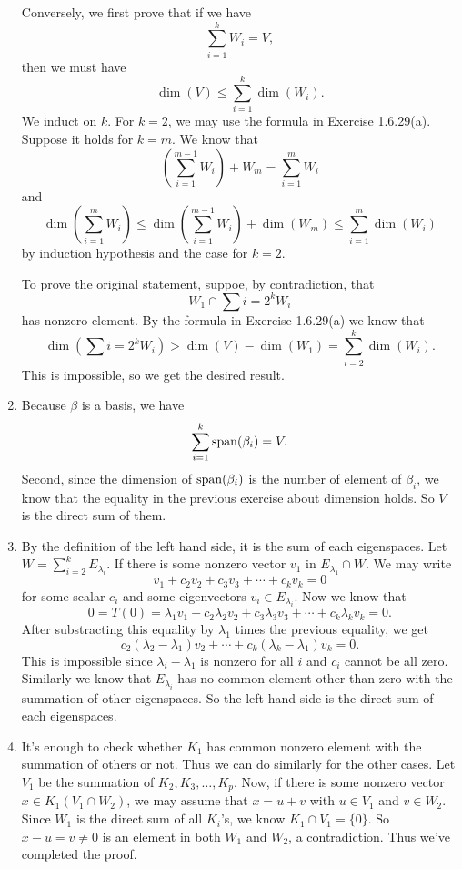 \begin{enumerate}
Conversely, we first prove that if we have 
\[\sum_{i=1}^k{W_i}=V,\]
then we must have 
\[\dim(V)\leq \sum_{i=1}^k{\dim(W_i)}.\]
We induct on $k$. For $k=2$, we may use the formula in Exercise 1.6.29(a). Suppose it holds for $k=m$. We know that 
\[(\sum_{i=1}^{m-1}{W_i})+W_m=\sum_{i=1}^m{W_i}\]
and 
\[\dim(\sum_{i=1}^m{W_i})\leq \dim(\sum_{i=1}^{m-1}{W_i})+\dim(W_m)\leq \sum_{i=1}^m{\dim(W_i)}\]
by induction hypothesis and the case for $k=2$.

To prove the original statement, suppoe, by contradiction, that 
\[W_1\cap \sum{i=2}^k{W_i}\]
has nonzero element. By the formula in Exercise 1.6.29(a) we know that 
\[\dim(\sum{i=2}^k{W_i})>\dim(V)-\dim(W_1)=\sum_{i=2}^k{\dim(W_i)}.\]
This is impossible, so we get the desired result.
\item Because $\beta $ is a basis, we have 
\[\sum_{i=1}^k{\sp(\beta_i)}=V.\]
Second, since the dimension of $\sp(\beta_i)$ is the number of element of $\beta_i$, we know that the equality in the previous exercise about dimension holds. So $V$ is the direct sum of them.
\item By the definition of the left hand side, it is the sum of each eigenspaces. Let $W=\sum_{i=2}^k{E_{\lambda_i}}$. If there is some nonzero vector $v_1$ in $E_{\lambda_1}\cap W$. We may write 
\[v_1+c_2v_2+c_3v_3+\cdots +c_kv_k=0\]
for some scalar $c_i$ and some eigenvectors $v_i\in E_{\lambda_i}$. Now we know that 
\[0=T(0)=\lambda_1v_1+c_2\lambda_2v_2+c_3\lambda_3v_3+\cdots +c_k\lambda_kv_k=0.\]
After substracting this equality by $\lambda_1$ times the previous equality, we get 
\[c_2(\lambda_2-\lambda_1)v_2+\cdots +c_k(\lambda_k-\lambda_1)v_k=0.\]
This is impossible since $\lambda_i-\lambda_1$ is nonzero for all $i$ and $c_i$ cannot be all zero. Similarly we know that $E_{\lambda_i}$ has no common element other than zero with the summation of other eigenspaces. So the left hand side is the direct sum of each eigenspaces.
\item It's enough to check whether $K_1$ has common nonzero element with the summation of others or not. Thus we can do similarly for the other cases. Let $V_1$ be the summation of $K_2,K_3,\ldots ,K_p$. Now, if there is some nonzero vector $x\in K_1(V_1\cap W_2)$, we may assume that $x=u+v$ with $u\in V_1$ and $v\in W_2$. Since $W_1$ is the direct sum of all $K_i$'s, we know $K_1\cap V_1=\{0\}$. So $x-u=v\neq 0$ is an element in both $W_1$ and $W_2$, a contradiction. Thus we've completed the proof.
\end{enumerate}
